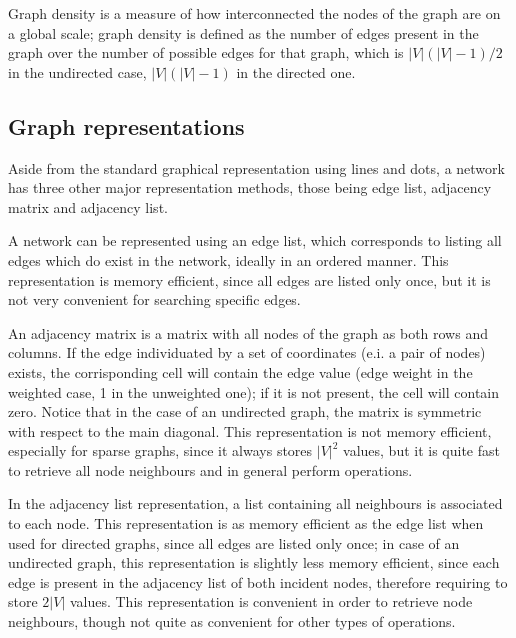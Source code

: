Graph density is a measure of how interconnected the nodes of the graph are on a global scale; graph density is defined as the number of edges present in the graph over the number of possible edges for that graph, which is $|V|(|V|-1)/2$ in the undirected case, $|V|(|V|-1)$ in the directed one. 

\subsection{Graph representations} 

Aside from the standard graphical representation using lines and dots, a network has three other major representation methods, those being edge list, adjacency matrix and adjacency list.

A network can be represented using an edge list, which corresponds to listing all edges which do exist in the network, ideally in an ordered manner. This representation is memory efficient, since all edges are listed only once, but it is not very convenient for searching specific edges.

An adjacency matrix is a matrix with all nodes of the graph as both rows and columns. If the edge individuated by a set of coordinates (e.i. a pair of nodes) exists, the corrisponding cell will contain the edge value (edge weight in the weighted case, 1 in the unweighted one); if it is not present, the cell will contain zero. Notice that in the case of an undirected graph, the matrix is symmetric with respect to the main diagonal. This representation is not memory efficient, especially for sparse graphs, since it always stores $|V|^2$ values, but it is quite fast to retrieve all node neighbours and in general perform operations. 

In the adjacency list representation, a list containing all neighbours is associated to each node. This representation is as memory efficient as the edge list when used for directed graphs, since all edges are listed only once; in case of an undirected graph, this representation is slightly less memory efficient, since each edge is present in the adjacency list of both incident nodes, therefore requiring to store $2|V|$ values. This representation is convenient in order to retrieve node neighbours, though not quite as convenient for other types of operations. 

